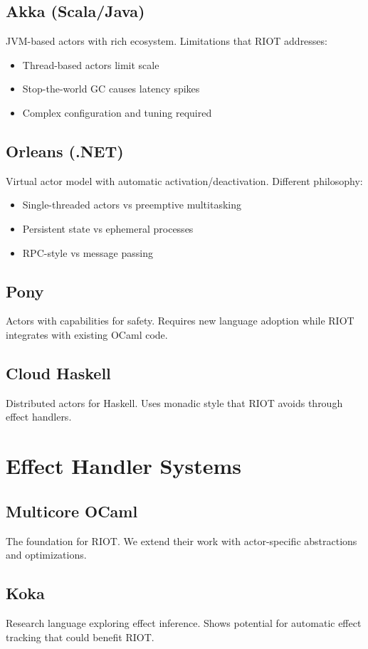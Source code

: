\documentclass[12pt,a4paper]{report}
\begin{document}
\subsection{Akka (Scala/Java)}
JVM-based actors with rich ecosystem. Limitations that RIOT addresses:
\begin{itemize}
\item Thread-based actors limit scale
\item Stop-the-world GC causes latency spikes  
\item Complex configuration and tuning required
\end{itemize}

\subsection{Orleans (.NET)}
Virtual actor model with automatic activation/deactivation. Different philosophy:
\begin{itemize}
\item Single-threaded actors vs preemptive multitasking
\item Persistent state vs ephemeral processes
\item RPC-style vs message passing
\end{itemize}

\subsection{Pony}
Actors with capabilities for safety. Requires new language adoption while RIOT integrates with existing OCaml code.

\subsection{Cloud Haskell}
Distributed actors for Haskell. Uses monadic style that RIOT avoids through effect handlers.

\section{Effect Handler Systems}

\subsection{Multicore OCaml}
The foundation for RIOT. We extend their work with actor-specific abstractions and optimizations.

\subsection{Koka}
Research language exploring effect inference. Shows potential for automatic effect tracking that could benefit RIOT.
\end{document}
